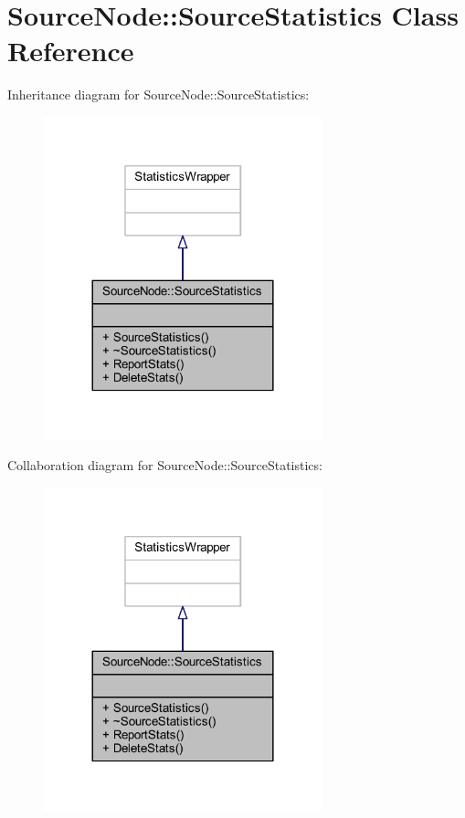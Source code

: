 \hypertarget{class_source_node_1_1_source_statistics}{}\section{Source\+Node\+:\+:Source\+Statistics Class Reference}
\label{class_source_node_1_1_source_statistics}


Inheritance diagram for Source\+Node\+:\+:Source\+Statistics\+:
\nopagebreak
\begin{figure}[H]
\begin{center}
\leavevmode
\includegraphics[width=228pt]{class_source_node_1_1_source_statistics__inherit__graph}
\end{center}
\end{figure}


Collaboration diagram for Source\+Node\+:\+:Source\+Statistics\+:
\nopagebreak
\begin{figure}[H]
\begin{center}
\leavevmode
\includegraphics[width=228pt]{class_source_node_1_1_source_statistics__coll__graph}
\end{center}
\end{figure}
